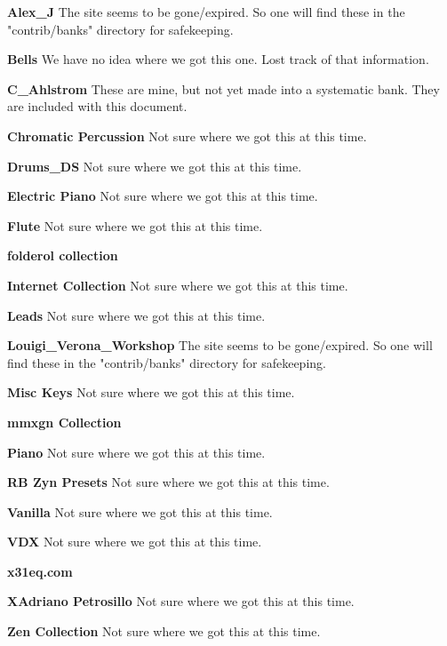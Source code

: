    \begin{enumber}
      \item \textbf{Alex\_J}
         The site seems to be gone/expired. So one will find these in the
         "contrib/banks" directory for safekeeping.
      \item \textbf{Bells}
         We have no idea where we got this one.
         Lost track of that information.
      \item \textbf{C\_Ahlstrom}
         These are mine, but not yet made into a systematic bank.
         They are included with this document.
      \item \textbf{Chromatic Percussion}
         Not sure where we got this at this time.
      \item \textbf{Drums\_DS}
         Not sure where we got this at this time.
      \item \textbf{Electric Piano}
         Not sure where we got this at this time.
      \item \textbf{Flute}
         Not sure where we got this at this time.
      \item \textbf{folderol collection} \cite{folderol}
      \item \textbf{Internet Collection}
         Not sure where we got this at this time.
      \item \textbf{Leads}
         Not sure where we got this at this time.
      \item \textbf{Louigi\_Verona\_Workshop}
         The site seems to be gone/expired. So one will find these in the
         "contrib/banks" directory for safekeeping.
      \item \textbf{Misc Keys}
         Not sure where we got this at this time.
      \item \textbf{mmxgn Collection} \cite{mmxgn}
      \item \textbf{Piano}
         Not sure where we got this at this time.
      \item \textbf{RB Zyn Presets}
         Not sure where we got this at this time.
      \item \textbf{Vanilla}
         Not sure where we got this at this time.
      \item \textbf{VDX}
         Not sure where we got this at this time.
      \item \textbf{x31eq.com} \cite{x31eq}
      \item \textbf{XAdriano Petrosillo}
         Not sure where we got this at this time.
      \item \textbf{Zen Collection}
         Not sure where we got this at this time.
   \end{enumber}


